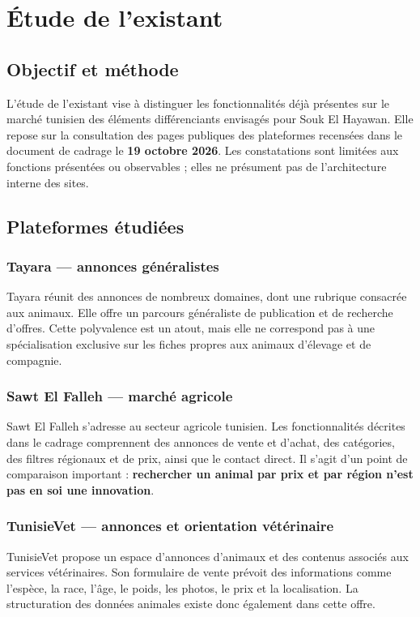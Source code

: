 \chapter{Étude de l’existant}
\section{Objectif et méthode}
L’étude de l’existant vise à distinguer les fonctionnalités déjà présentes sur le marché tunisien des éléments différenciants envisagés pour Souk El Hayawan. Elle repose sur la consultation des pages publiques des plateformes recensées dans le document de cadrage le \textbf{19 octobre 2026}. Les constatations sont limitées aux fonctions présentées ou observables ; elles ne présument pas de l’architecture interne des sites.

\section{Plateformes étudiées}
\subsection{Tayara --- annonces généralistes}
Tayara réunit des annonces de nombreux domaines, dont une rubrique consacrée aux animaux. Elle offre un parcours généraliste de publication et de recherche d’offres. Cette polyvalence est un atout, mais elle ne correspond pas à une spécialisation exclusive sur les fiches propres aux animaux d’élevage et de compagnie.\par
{}

\subsection{Sawt El Falleh --- marché agricole}
Sawt El Falleh s’adresse au secteur agricole tunisien. Les fonctionnalités décrites dans le cadrage comprennent des annonces de vente et d’achat, des catégories, des filtres régionaux et de prix, ainsi que le contact direct. Il s’agit d’un point de comparaison important : \textbf{rechercher un animal par prix et par région n’est pas en soi une innovation}.\par
{}

\subsection{TunisieVet --- annonces et orientation vétérinaire}
TunisieVet propose un espace d’annonces d’animaux et des contenus associés aux services vétérinaires. Son formulaire de vente prévoit des informations comme l’espèce, la race, l’âge, le poids, les photos, le prix et la localisation. La structuration des données animales existe donc également dans cette offre.\par
{}

